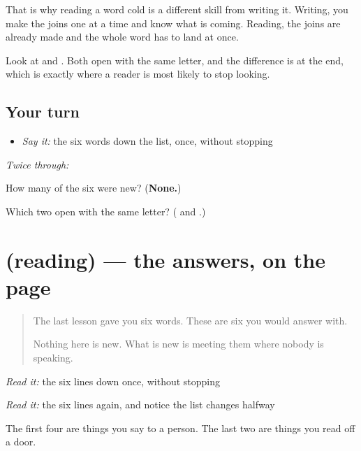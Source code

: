 That is why reading a word cold is a different skill from writing it. Writing, you make the joins one at a time and know what is coming. Reading, the joins are already made and the whole word has to land at once.

Look at \textbf{} and \textbf{}. Both open with the same letter, and the difference is at the end, which is exactly where a reader is most likely to stop looking.

\subsection*{Your turn}
\begin{itemize}
\raggedright
  \item \emph{Say it:} the six words down the list, once, without stopping
\end{itemize}

\emph{Twice through:}

\begin{tcolorbox}[breakable,colback=teal!4,colframe=teal!35!black,title={Before you move on}]
How many of the six were new? (\textbf{None.})

Which two open with the same letter? (\textbf{} and \textbf{}.)
\end{tcolorbox}
\section[(reading)]{(reading) — the answers, on the page}

\label{lesson:FA-C21-answers}



\begin{quote}
The last lesson gave you six words. These are six you would answer with.

Nothing here is new. What is new is meeting them where nobody is speaking.
\end{quote}

\begin{tcolorbox}[breakable,skin=enhanced,colback=orange!6,colframe=orange!45!black,boxrule=0.5pt,arc=1mm,left=6pt,right=6pt,top=4pt,bottom=4pt,fonttitle=\bfseries,title={Read this}]
\begin{quote}
     
\end{quote}

\emph{Read it:} the six lines down once, without stopping

\emph{Read it:} the six lines again, and notice the list changes halfway

The first four are things you say to a person. The last two are things you read off a door.
\end{tcolorbox}

